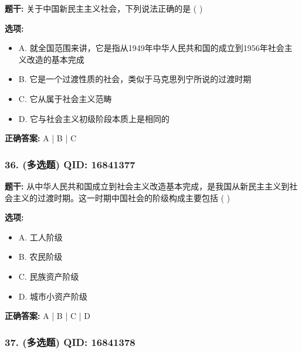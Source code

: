 \documentclass[12pt,UTF8]{ctexart}
\begin{document}
\textbf{题干:}
关于中国新民主主义社会，下列说法正确的是 ( )

\textbf{选项:}
\begin{itemize}[leftmargin=*]

  \item A. 就全国范围来讲，它是指从1949年中华人民共和国的成立到1956年社会主义改造的基本完成

  \item B. 它是一个过渡性质的社会，类似于马克思列宁所说的过渡时期

  \item C. 它从属于社会主义范畴

  \item D. 它与社会主义初级阶段本质上是相同的

\end{itemize}

\textbf{正确答案:}
A | B | C

\vspace{0.3em}\hrulefill\vspace{0.7em}

\subsubsection*{36. (多选题) \small QID: 16841377}

\textbf{题干:}
从中华人民共和国成立到社会主义改造基本完成，是我国从新民主主义到社会主义的过渡时期。这一时期中国社会的阶级构成主要包括 ( )

\textbf{选项:}
\begin{itemize}[leftmargin=*]

  \item A. 工人阶级

  \item B. 农民阶级

  \item C. 民族资产阶级

  \item D. 城市小资产阶级

\end{itemize}

\textbf{正确答案:}
A | B | C | D

\vspace{0.3em}\hrulefill\vspace{0.7em}

\subsubsection*{37. (多选题) \small QID: 16841378}
\end{document}
